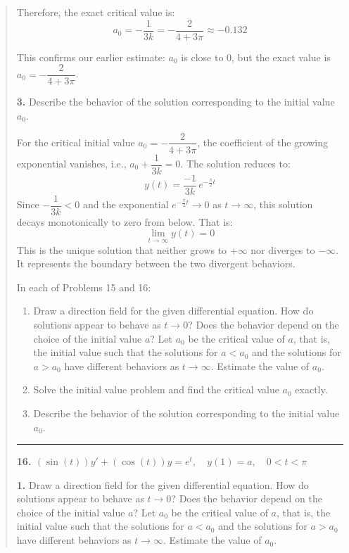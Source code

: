 \begin{quote}
\begin{respuesta}
Therefore, the exact critical value is:
\[
\boxed{a_0 = -\frac{1}{3k} = -\frac{2}{4+3\pi} \approx -0.132}
\]

This confirms our earlier estimate: $a_0$ is close to $0$, but the exact value is $a_0 = -\dfrac{2}{4+3\pi}$.



\textbf{3. }Describe the behavior of the solution corresponding to the initial value $a_0$.

For the critical initial value $a_0 = -\dfrac{2}{4+3\pi}$, the coefficient of the 
growing exponential vanishes, i.e., $a_0 + \dfrac{1}{3k} = 0$. The solution reduces to:
\[
y(t) = \frac{-1}{3k}\,e^{-\frac{\pi}{2}t}
\]
Since $-\dfrac{1}{3k} < 0$ and the exponential $e^{-\frac{\pi}{2}t} \to 0$ as 
$t \to \infty$, this solution decays monotonically to zero from below. That is:
\[
\lim_{t \to \infty} y(t) = 0
\]
This is the unique solution that neither grows to $+\infty$ nor diverges to $-\infty$. 
It represents the boundary between the two divergent behaviors.



\end{respuesta}


\noindent In each of Problems 15 and 16:
\begin{enumerate}
    \item Draw a direction field for the given differential equation. How do solutions appear to behave as $t \to 0$? Does the behavior depend on the choice of the initial value $a$? Let $a_0$ be the critical value of $a$, that is, the initial value such that the solutions for $a < a_0$ and the solutions for $a > a_0$ have different behaviors as $t \to \infty$. Estimate the value of $a_0$.
    \item Solve the initial value problem and find the critical value $a_0$ exactly.
    \item Describe the behavior of the solution corresponding to the initial value $a_0$.
\end{enumerate}


\begin{center}
    \rule{0.5\textwidth}{0.5pt}
\end{center}



\textbf{16. $(\sin(t))y' + (\cos(t))y = e^t, \quad y(1) = a, \quad 0 < t < \pi$}
\begin{respuesta}

\textbf{1. }Draw a direction field for the given differential equation. How do solutions appear to behave as $t \to 0$? Does the behavior depend on the choice of the initial value $a$? Let $a_0$ be the critical value of $a$, that is, the initial value such that the solutions for $a < a_0$ and the solutions for $a > a_0$ have different behaviors as $t \to \infty$. Estimate the value of $a_0$.


\end{respuesta}
\end{quote}
